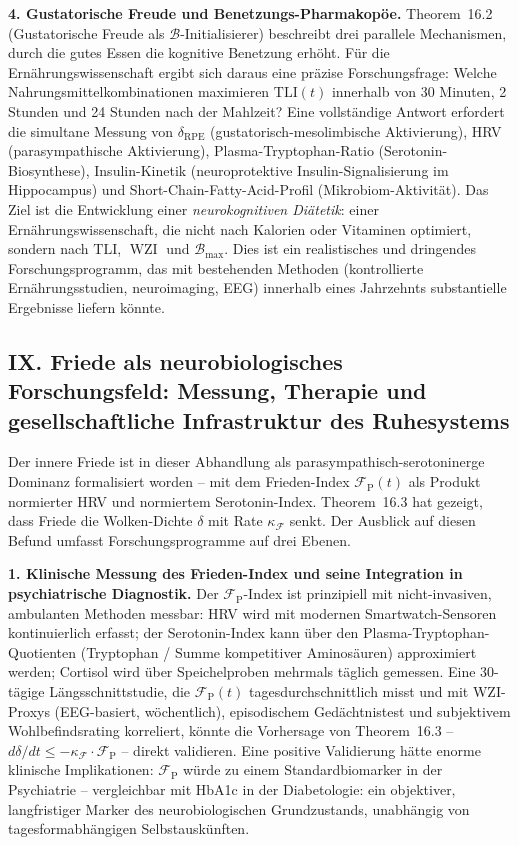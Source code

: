 ﻿\documentclass[12pt,a4paper]{report}
\theoremstyle{plain}
\theoremstyle{definition}
\theoremstyle{remark}
\DeclareMathOperator{\WZI}{WZI}
\begin{document}
	\textbf{4. Gustatorische Freude und Benetzungs-Pharmakopöe.}
	Theorem~16.2 (Gustatorische Freude als $\mathcal{B}$-Initialisierer)
	beschreibt drei parallele Mechanismen, durch die gutes Essen
	die kognitive Benetzung erhöht.
	Für die Ernährungswissenschaft ergibt sich daraus eine
	präzise Forschungsfrage: Welche Nahrungsmittelkombinationen
	maximieren $\mathrm{TLI}(t)$ innerhalb von 30 Minuten,
	2 Stunden und 24 Stunden nach der Mahlzeit?
	Eine vollständige Antwort erfordert die simultane Messung von
	$\delta_{\mathrm{RPE}}$ (gustatorisch-mesolimbische Aktivierung),
	HRV (parasympathische Aktivierung), Plasma-Tryptophan-Ratio
	(Serotonin-Biosynthese), Insulin-Kinetik (neuroprotektive
	Insulin-Signalisierung im Hippocampus) und Short-Chain-Fatty-Acid-Profil
	(Mikrobiom-Aktivität).
	Das Ziel ist die Entwicklung einer \emph{neurokognitiven Diätetik}:
	einer Ernährungswissenschaft, die nicht nach Kalorien oder
	Vitaminen optimiert, sondern nach $\mathrm{TLI}$, $\WZI$ und
	$\mathcal{B}_{\max}$.
	Dies ist ein realistisches und dringendes Forschungsprogramm,
	das mit bestehenden Methoden (kontrollierte Ernährungsstudien,
	neuroimaging, EEG) innerhalb eines Jahrzehnts substantielle
	Ergebnisse liefern könnte.

	\subsection*{IX. Friede als neurobiologisches Forschungsfeld:
		Messung, Therapie und gesellschaftliche Infrastruktur des Ruhesystems}

	Der innere Friede ist in dieser Abhandlung als parasympathisch-serotoninerge
	Dominanz formalisiert worden -- mit dem Frieden-Index $\mathcal{F}_{\mathrm{P}}(t)$
	als Produkt normierter HRV und normiertem Serotonin-Index.
	Theorem~16.3 hat gezeigt, dass Friede die Wolken-Dichte $\delta$
	mit Rate $\kappa_\mathcal{F}$ senkt. Der Ausblick auf diesen Befund
	umfasst Forschungsprogramme auf drei Ebenen.

	\textbf{1. Klinische Messung des Frieden-Index und seine Integration
		in psychiatrische Diagnostik.}
	Der $\mathcal{F}_{\mathrm{P}}$-Index ist prinzipiell mit
	nicht-invasiven, ambulanten Methoden messbar:
	HRV wird mit modernen Smartwatch-Sensoren kontinuierlich erfasst;
	der Serotonin-Index kann über den Plasma-Tryptophan-Quotienten
	(Tryptophan / Summe kompetitiver Aminosäuren) approximiert werden;
	Cortisol wird über Speichelproben mehrmals täglich gemessen.
	Eine 30-tägige Längsschnittstudie, die $\mathcal{F}_{\mathrm{P}}(t)$
	tagesdurchschnittlich misst und mit WZI-Proxys (EEG-basiert,
	wöchentlich), episodischem Gedächtnistest und subjektivem
	Wohlbefindsrating korreliert, könnte die Vorhersage von
	Theorem~16.3 -- $d\delta/dt \leq -\kappa_\mathcal{F} \cdot \mathcal{F}_{\mathrm{P}}$ --
	direkt validieren.
	Eine positive Validierung hätte enorme klinische Implikationen:
	$\mathcal{F}_{\mathrm{P}}$ würde zu einem Standardbiomarker
	in der Psychiatrie -- vergleichbar mit HbA1c in der Diabetologie:
	ein objektiver, langfristiger Marker des neurobiologischen
	Grundzustands, unabhängig von tagesformabhängigen Selbstauskünften.
\end{document}
